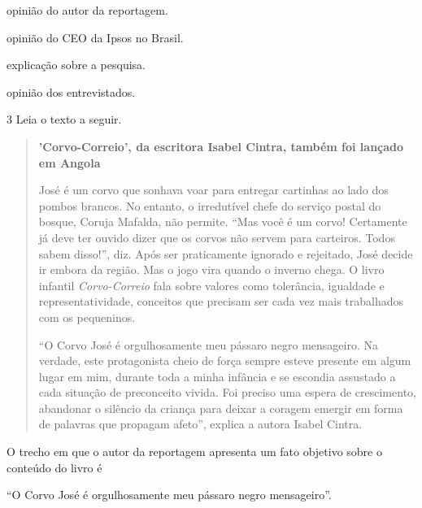 \begin{conteudo}
\begin{conteudo}
\begin{conteudo}
\begin{conteudo}
\begin{escolha}
\item opinião do autor da reportagem.

\item opinião do CEO da Ipsos no Brasil.

\item explicação sobre a pesquisa.

\item opinião dos entrevistados.
\end{escolha}

\num{3} Leia o texto a seguir.

\begin{quote}
\textbf{'Corvo-Correio', da escritora Isabel Cintra, também foi lançado 
em Angola}

José é um corvo que sonhava voar para entregar cartinhas ao lado dos
pombos brancos. No entanto, o irredutível chefe do serviço postal do
bosque, Coruja Mafalda, não permite. ``Mas você é um corvo! Certamente já
deve ter ouvido dizer que os corvos não servem para carteiros. Todos
sabem disso!'', diz. Após ser praticamente ignorado e rejeitado, José
decide ir embora da região. Mas o jogo vira quando o inverno chega. O
livro infantil \textit{Corvo-Correio} fala sobre valores como tolerância,
igualdade e representatividade, conceitos que precisam ser cada vez mais
trabalhados com os pequeninos.

``O Corvo José é orgulhosamente meu pássaro negro mensageiro. Na
verdade, este protagonista cheio de força sempre esteve presente em
algum lugar em mim, durante toda a minha infância e se escondia
assustado a cada situação de preconceito vivida. Foi preciso uma espera
de crescimento, abandonar o silêncio da criança para deixar a coragem
emergir em forma de palavras que propagam afeto'', explica a autora
Isabel Cintra.

\end{quote}

O trecho em que o autor da reportagem apresenta um fato objetivo sobre
o conteúdo do livro é

\begin{escolha}
\item ``O Corvo José é orgulhosamente meu pássaro negro mensageiro''.


\end{escolha}
\end{conteudo}
\end{conteudo}
\end{conteudo}
\end{conteudo}
